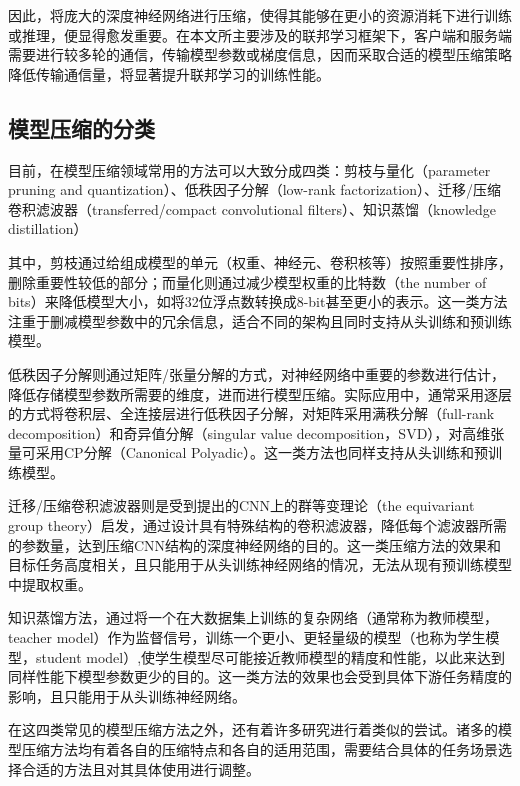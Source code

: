 因此，将庞大的深度神经网络进行压缩，使得其能够在更小的资源消耗下进行训练或推理，便显得愈发重要。在本文所主要涉及的联邦学习框架下，客户端和服务端需要进行较多轮的通信，传输模型参数或梯度信息，因而采取合适的模型压缩策略降低传输通信量，将显著提升联邦学习的训练性能。

\subsection{模型压缩的分类}

目前，在模型压缩领域常用的方法可以大致分成四类\cite{cheng2017survey}：剪枝与量化（parameter pruning and quantization）、低秩因子分解（low-rank factorization）、迁移/压缩卷积滤波器（transferred/compact convolutional filters）、知识蒸馏（knowledge distillation）

其中，剪枝通过给组成模型的单元（权重、神经元、卷积核等）按照重要性排序，删除重要性较低的部分；而量化则通过减少模型权重的比特数（the number of bits）来降低模型大小，如将32位浮点数转换成8-bit甚至更小的表示。这一类方法注重于删减模型参数中的冗余信息，适合不同的架构且同时支持从头训练和预训练模型。

低秩因子分解则通过矩阵/张量分解的方式，对神经网络中重要的参数进行估计，降低存储模型参数所需要的维度，进而进行模型压缩。实际应用中，通常采用逐层的方式将卷积层、全连接层进行低秩因子分解，对矩阵采用满秩分解（full-rank decomposition）和奇异值分解（singular value decomposition，SVD）\cite{denton2014exploiting}，对高维张量可采用CP分解（Canonical Polyadic）\cite{lebedev2014speeding}。这一类方法也同样支持从头训练和预训练模型。

迁移/压缩卷积滤波器则是受到\parencite{cohen2016group}提出的CNN上的群等变理论（the equivariant group theory）启发，通过设计具有特殊结构的卷积滤波器，降低每个滤波器所需的参数量，达到压缩CNN结构的深度神经网络的目的。这一类压缩方法的效果和目标任务高度相关，且只能用于从头训练神经网络的情况，无法从现有预训练模型中提取权重。

知识蒸馏\cite{hinton2015distilling}方法，通过将一个在大数据集上训练的复杂网络（通常称为教师模型，teacher model）作为监督信号，训练一个更小、更轻量级的模型（也称为学生模型，student model）,使学生模型尽可能接近教师模型的精度和性能，以此来达到同样性能下模型参数更少的目的。这一类方法的效果也会受到具体下游任务精度的影响，且只能用于从头训练神经网络。

在这四类常见的模型压缩方法之外，还有着许多研究进行着类似的尝试\cite{hinton2015distilling,almahairi2016dynamic, shazeer2017outrageously}。诸多的模型压缩方法均有着各自的压缩特点和各自的适用范围，需要结合具体的任务场景选择合适的方法且对其具体使用进行调整。


